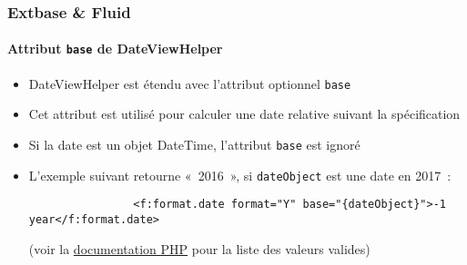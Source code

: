 \begin{frame}[fragile]
	\frametitle{Extbase \& Fluid}
	\framesubtitle{Attribut \texttt{base} de DateViewHelper}


	\begin{itemize}

		\item DateViewHelper est étendu avec l'attribut optionnel \texttt{base}
		\item Cet attribut est utilisé pour calculer une date relative suivant la spécification
		\item Si la date est un objet DateTime, l'attribut \texttt{base} est ignoré
		\item L'exemple suivant retourne «~2016~», si \texttt{dateObject} est une date en 2017~:

			\begin{lstlisting}
				<f:format.date format="Y" base="{dateObject}">-1 year</f:format.date>
			\end{lstlisting}

		\small
			(voir la \href{http://www.php.net/manual/en/datetime.formats.relative.php}{documentation PHP}
			pour la liste des valeurs valides)
		\normalsize

	\end{itemize}

\end{frame}


